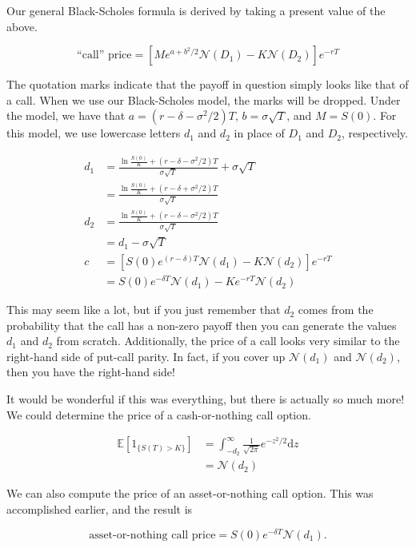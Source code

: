 \documentclass{ximera}
\begin{document}
Our general Black-Scholes formula is derived by taking a present value of the above.

\begin{equation*}
\text{``call'' price}=\left[Me^{a+b^2/2}\mathcal{N}(D_1)-K\mathcal{N}(D_2)\right]e^{-rT}
\end{equation*}

The quotation marks indicate that the payoff in question simply looks like that of a call. When we use our Black-Scholes model, the marks will be dropped. Under the model, we have that $a=(r-\delta-\sigma^2/2)T$, $b=\sigma\sqrt{T}$, and $M=S(0)$. For this model, we use lowercase letters $d_1$ and $d_2$ in place of $D_1$ and $D_2$, respectively. 

\begin{align*}
d_1 	&=\frac{\ln\frac{S(0)}{K}+(r-\delta-\sigma^2/2)T}{\sigma\sqrt{T}}+\sigma\sqrt{T}\\
	&=\frac{\ln\frac{S(0)}{K}+(r-\delta+\sigma^2/2)T}{\sigma\sqrt{T}}\\
d_2 	&=\frac{\ln\frac{S(0)}{K}+(r-\delta-\sigma^2/2)T}{\sigma\sqrt{T}}\\
	&=d_1-\sigma\sqrt{T}\\
c 	&=\left[S(0)e^{(r-\delta)T}\mathcal{N}(d_1)-K\mathcal{N}(d_2)\right]e^{-rT}\\
	&=S(0)e^{-\delta T}\mathcal{N}(d_1)-Ke^{-rT}\mathcal{N}(d_2)
\end{align*}

This may seem like a lot, but if you just remember that $d_2$ comes from the probability that the call has a non-zero payoff then you can generate the values $d_1$ and $d_2$ from scratch. Additionally, the price of a call looks very similar to the right-hand side of put-call parity. In fact, if you cover up $\mathcal{N}(d_1)$ and $\mathcal{N}(d_2)$, then you have the right-hand side!

It would be wonderful if this was everything, but there is actually so much more! We could determine the price of a cash-or-nothing call option. 

\begin{align*}
\mathbb{E}[1_{\{S(T)>K\}}] 	&=\int_{-d_2}^\infty \frac{1}{\sqrt{2\pi}}e^{-z^2/2}\mathrm{d}z\\
				&=\mathcal{N}(d_2)
\end{align*}

We can also compute the price of an asset-or-nothing call option. This was accomplished earlier, and the result is

\begin{equation*}
\text{asset-or-nothing call price}=S(0)e^{-\delta T}\mathcal{N}(d_1).
\end{equation*}
\end{document}
